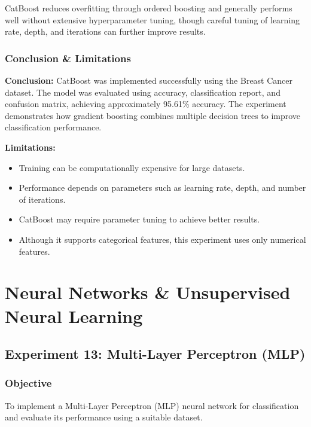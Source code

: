 \documentclass[a4paper,11pt]{article}
\begin{document}
\begin{itemize}
CatBoost reduces overfitting through ordered boosting and generally performs well without extensive hyperparameter tuning, though careful tuning of learning rate, depth, and iterations can further improve results.

\subsubsection{Conclusion \& Limitations}

\textbf{Conclusion:} CatBoost was implemented successfully using the Breast Cancer dataset. The model was evaluated using accuracy, classification report, and confusion matrix, achieving approximately 95.61\% accuracy. The experiment demonstrates how gradient boosting combines multiple decision trees to improve classification performance.

\textbf{Limitations:}
\begin{itemize}
    \item Training can be computationally expensive for large datasets.
    \item Performance depends on parameters such as learning rate, depth, and number of iterations.
    \item CatBoost may require parameter tuning to achieve better results.
    \item Although it supports categorical features, this experiment uses only numerical features.
\end{itemize}



\section{Neural Networks \& Unsupervised Neural Learning}

\subsection{Experiment 13: Multi-Layer Perceptron (MLP)}

\subsubsection{Objective}
To implement a Multi-Layer Perceptron (MLP) neural network for classification and evaluate its performance using a suitable dataset.


\end{itemize}
\end{document}
